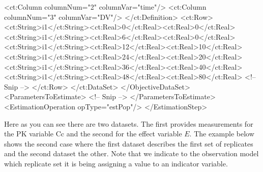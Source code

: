 \documentclass[a4paper,11pt]{article}
\begin{document}
\begin{xmlcode}
                <ct:Column columnNum="2" columnVar="time"/>
                <ct:Column columnNum="3" columnVar="DV"/>
            </ct:Definition>
            <ct:Row>
                <ct:String>i1</ct:String><ct:Real>0</ct:Real><ct:Real>0</ct:Real>
                <ct:String>i1</ct:String><ct:Real>6</ct:Real><ct:Real>0</ct:Real>
                <ct:String>i1</ct:String><ct:Real>12</ct:Real><ct:Real>10</ct:Real>
                <ct:String>i1</ct:String><ct:Real>24</ct:Real><ct:Real>20</ct:Real>
                <ct:String>i1</ct:String><ct:Real>36</ct:Real><ct:Real>40</ct:Real>
                <ct:String>i1</ct:String><ct:Real>48</ct:Real><ct:Real>80</ct:Real>
                <!-- Snip -->
            </ct:Row>
        </ct:DataSet>
    </ObjectiveDataSet>
    <ParametersToEstimate>
      <!-- Snip -->
    </ParametersToEstimate>
    <EstimationOperation opType="estPop"/>
</EstimationStep>
\end{xmlcode}
%
Here as you can see there are two datasets. The first provides
measurements for the PK variable $\mathrm{Cc}$ and the second for the
effect variable $E$. The example below shows the second case where the
first dataset describes the first set of replicates and the second
dataset the other. Note that we indicate to the observation model
which replicate set it is being assigning a value to an indicator variable.
%
\end{document}
